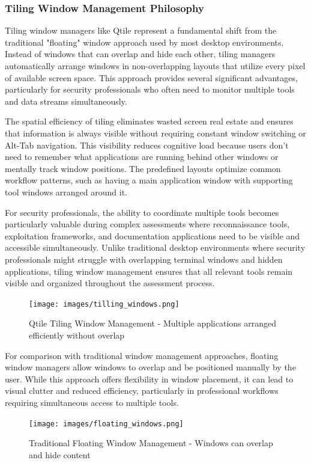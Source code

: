 \documentclass[12pt,a4paper]{article}
\begin{document}
\subsubsection{Tiling Window Management Philosophy}
Tiling window managers like Qtile represent a fundamental shift from the traditional "floating" window approach used by most desktop environments. Instead of windows that can overlap and hide each other, tiling managers automatically arrange windows in non-overlapping layouts that utilize every pixel of available screen space. This approach provides several significant advantages, particularly for security professionals who often need to monitor multiple tools and data streams simultaneously.

The spatial efficiency of tiling eliminates wasted screen real estate and ensures that information is always visible without requiring constant window switching or Alt-Tab navigation. This visibility reduces cognitive load because users don't need to remember what applications are running behind other windows or mentally track window positions. The predefined layouts optimize common workflow patterns, such as having a main application window with supporting tool windows arranged around it.

For security professionals, the ability to coordinate multiple tools becomes particularly valuable during complex assessments where reconnaissance tools, exploitation frameworks, and documentation applications need to be visible and accessible simultaneously. Unlike traditional desktop environments where security professionals might struggle with overlapping terminal windows and hidden applications, tiling window management ensures that all relevant tools remain visible and organized throughout the assessment process.

\begin{figure}[H]
\centering
\texttt{[image: images/tilling\_windows.png]}
\caption{Qtile Tiling Window Management - Multiple applications arranged efficiently without overlap}
\end{figure}

For comparison with traditional window management approaches, floating window managers allow windows to overlap and be positioned manually by the user. While this approach offers flexibility in window placement, it can lead to visual clutter and reduced efficiency, particularly in professional workflows requiring simultaneous access to multiple tools.

\begin{figure}[H]
\centering
\texttt{[image: images/floating\_windows.png]}
\caption{Traditional Floating Window Management - Windows can overlap and hide content}
\end{figure}
\end{document}
